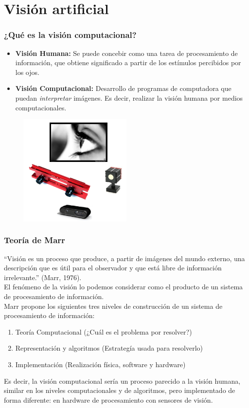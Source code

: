 \section{Visión artificial}

\begin{frame}\frametitle{¿Qué es la visión computacional?}
  \begin{itemize}
  \item \textbf{Visión Humana: } Se puede concebir como una tarea de procesamiento de información, que obtiene significado a partir de los estímulos percibidos por los ojos.
  \item \textbf{Visión Computacional: } Desarrollo de programas de computadora que puedan \textit{interpretar} imágenes. Es decir, realizar la visión humana por medios computacionales. 
  \end{itemize}
  \begin{figure}
    \centering
    \includegraphics[width=0.5\textwidth]{Figures/ComputerVision.png}
  \end{figure}
\end{frame}

\begin{frame}\frametitle{Teoría de Marr}
“Visión es un proceso que produce, a partir de imágenes del mundo externo, una descripción que es útil para el observador y que está libre de información irrelevante.” (Marr, 1976).\\
El fenómeno de la visión lo podemos considerar como el producto de un sistema de procesamiento de información.\\

Marr propone los siguientes tres niveles de construcción de un sistema de procesamiento de información:\\
\begin{enumerate}
\item Teoría Computacional (¿Cuál es el problema por resolver?)
\item Representación y algoritmos (Estrategía usada para resolverlo)
\item Implementación (Realización física, software y hardware)
\end{enumerate}
Es decir, la visión computacional sería un proceso parecido a la visión humana, similar en los niveles computacionales y de algoritmos, pero implementado de forma diferente: en hardware de procesamiento con sensores de visión. 
\end{frame}

